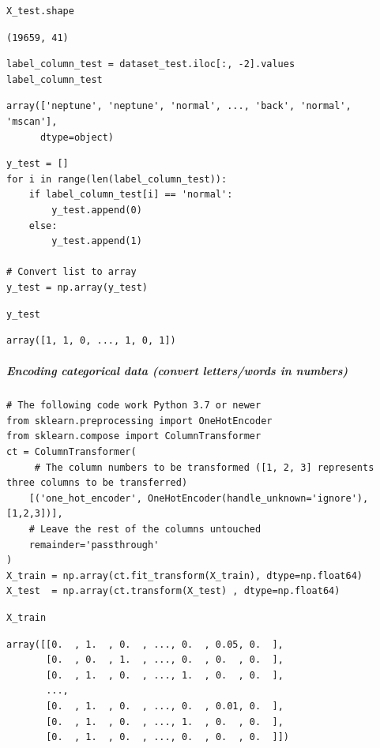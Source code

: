\begin{verbatim}
X_test.shape
\end{verbatim}

\begin{verbatim}
(19659, 41)
\end{verbatim}

\begin{verbatim}
label_column_test = dataset_test.iloc[:, -2].values
label_column_test
\end{verbatim}

\begin{verbatim}
array(['neptune', 'neptune', 'normal', ..., 'back', 'normal', 'mscan'],
      dtype=object)
\end{verbatim}

\begin{verbatim}
y_test = []
for i in range(len(label_column_test)):
    if label_column_test[i] == 'normal':
        y_test.append(0)
    else:
        y_test.append(1)

# Convert list to array
y_test = np.array(y_test)
\end{verbatim}

\begin{verbatim}
y_test
\end{verbatim}

\begin{verbatim}
array([1, 1, 0, ..., 1, 0, 1])
\end{verbatim}

\subparagraph{Encoding categorical data (convert letters/words in numbers)}

\begin{verbatim}
# The following code work Python 3.7 or newer
from sklearn.preprocessing import OneHotEncoder
from sklearn.compose import ColumnTransformer
ct = ColumnTransformer(
     # The column numbers to be transformed ([1, 2, 3] represents three columns to be transferred)
    [('one_hot_encoder', OneHotEncoder(handle_unknown='ignore'), [1,2,3])],
    # Leave the rest of the columns untouched
    remainder='passthrough'
)
X_train = np.array(ct.fit_transform(X_train), dtype=np.float64)
X_test  = np.array(ct.transform(X_test) , dtype=np.float64)
\end{verbatim}

\begin{verbatim}
X_train
\end{verbatim}

\begin{verbatim}
array([[0.  , 1.  , 0.  , ..., 0.  , 0.05, 0.  ],
       [0.  , 0.  , 1.  , ..., 0.  , 0.  , 0.  ],
       [0.  , 1.  , 0.  , ..., 1.  , 0.  , 0.  ],
       ...,
       [0.  , 1.  , 0.  , ..., 0.  , 0.01, 0.  ],
       [0.  , 1.  , 0.  , ..., 1.  , 0.  , 0.  ],
       [0.  , 1.  , 0.  , ..., 0.  , 0.  , 0.  ]])
\end{verbatim}


